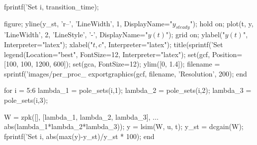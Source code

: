 \begin{matlabcode}
    fprintf('Set %
        i, transition_time);
    
    figure;
    yline(y_st, 'r--', 'LineWidth', 1, DisplayName="$y_{steady}$");
    hold on;
    plot(t, y, 'LineWidth', 2, 'LineStyle', '-', DisplayName="$y(t)$");
    grid on;
    ylabel("$y(t)$", Interpreter="latex");
    xlabel("$t, c$", Interpreter="latex");
    title(sprintf('Set %
    legend(Location="best", FontSize=12, Interpreter="latex");
    set(gcf, Position=[100, 100, 1200, 600]);
    set(gca, FontSize=12);
    ylim([0, 1.4]);
    filename = sprintf('images/per_proc_%
    exportgraphics(gcf, filename, 'Resolution', 200);
end

for i = 5:6
    lambda_1 = pole_sets(i,1);
    lambda_2 = pole_sets(i,2);
    lambda_3 = pole_sets(i,3);

    W = zpk([], [lambda_1, lambda_2, lambda_3], ...
        abs(lambda_1*lambda_2*lambda_3));
    y = lsim(W, u, t);
    y_st = dcgain(W);
    fprintf('Set %
        i, abs(max(y)-y_st)/y_st * 100);
end


\end{matlabcode}
